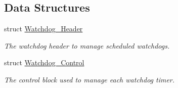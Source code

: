 \subsection*{Data Structures}
\begin{DoxyCompactItemize}
\item 
struct \mbox{\hyperlink{structWatchdog__Header}{Watchdog\+\_\+\+Header}}
\begin{DoxyCompactList}\small\item\em The watchdog header to manage scheduled watchdogs. \end{DoxyCompactList}\item 
struct \mbox{\hyperlink{structWatchdog__Control}{Watchdog\+\_\+\+Control}}
\begin{DoxyCompactList}\small\item\em The control block used to manage each watchdog timer. \end{DoxyCompactList}\end{DoxyCompactItemize}
